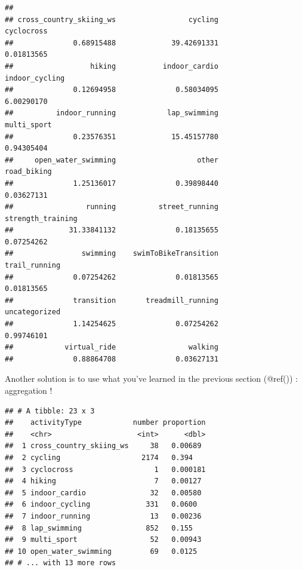 \documentclass[
]{book}
\newenvironment{Shaded}{\begin{snugshade}}{\end{snugshade}}
\newcommand{\DataTypeTok}[1]{\textcolor[rgb]{0.13,0.29,0.53}{#1}}
\newcommand{\KeywordTok}[1]{\textcolor[rgb]{0.13,0.29,0.53}{\textbf{#1}}}
\newcommand{\NormalTok}[1]{#1}
\newcommand{\OperatorTok}[1]{\textcolor[rgb]{0.81,0.36,0.00}{\textbf{#1}}}
\newcommand{\StringTok}[1]{\textcolor[rgb]{0.31,0.60,0.02}{#1}}
\begin{document}
\begin{verbatim}
## 
## cross_country_skiing_ws                 cycling              cyclocross 
##              0.68915488             39.42691331              0.01813565 
##                  hiking           indoor_cardio          indoor_cycling 
##              0.12694958              0.58034095              6.00290170 
##          indoor_running            lap_swimming             multi_sport 
##              0.23576351             15.45157780              0.94305404 
##     open_water_swimming                   other             road_biking 
##              1.25136017              0.39898440              0.03627131 
##                 running          street_running       strength_training 
##             31.33841132              0.18135655              0.07254262 
##                swimming    swimToBikeTransition           trail_running 
##              0.07254262              0.01813565              0.01813565 
##              transition       treadmill_running           uncategorized 
##              1.14254625              0.07254262              0.99746101 
##            virtual_ride                 walking 
##              0.88864708              0.03627131
\end{verbatim}

Another solution is to use what you've learned in the previous section (@ref()) : aggregation !

\begin{Shaded}
\end{Shaded}

\begin{verbatim}
## # A tibble: 23 x 3
##    activityType            number proportion
##    <chr>                    <int>      <dbl>
##  1 cross_country_skiing_ws     38   0.00689 
##  2 cycling                   2174   0.394   
##  3 cyclocross                   1   0.000181
##  4 hiking                       7   0.00127 
##  5 indoor_cardio               32   0.00580 
##  6 indoor_cycling             331   0.0600  
##  7 indoor_running              13   0.00236 
##  8 lap_swimming               852   0.155   
##  9 multi_sport                 52   0.00943 
## 10 open_water_swimming         69   0.0125  
## # ... with 13 more rows
\end{verbatim}
\end{document}
